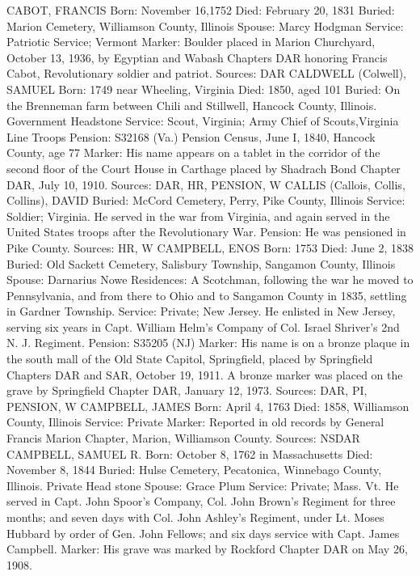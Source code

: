 CABOT, FRANCIS 
Born: November 16,1752 
Died: February 20, 1831 
Buried: Marion Cemetery, Williamson County, Illinois 
Spouse: Marcy Hodgman 
Service: Patriotic Service; Vermont 
Marker: Boulder placed in Marion Churchyard, October 13, 1936, by Egyptian and Wabash Chapters DAR honoring Francis Cabot, Revolutionary soldier and patriot. 
Sources: DAR 
CALDWELL (Colwell), SAMUEL 
Born: 1749 near Wheeling, Virginia 
Died: 1850, aged 101 
Buried: On the Brenneman farm between Chili and Stillwell, Hancock County, Illinois. Government Headstone 
Service: Scout, Virginia; Army Chief of Scouts,Virginia Line Troops
Pension: S32168 (Va.) Pension Census, June I, 1840, Hancock County, age 77 
Marker: His name appears on a tablet in the corridor of the second floor of the Court House in Carthage placed by Shadrach Bond Chapter DAR, July 10, 1910. 
Sources: DAR, HR, PENSION, W 
CALLIS (Callois, Collis, Collins), DAVID 
Buried: McCord Cemetery, Perry, Pike County, Illinois 
Service: Soldier; Virginia. He served in the war from Virginia, and again served in the United States troops after the Revolutionary War. 
Pension: He was pensioned in Pike County. 
Sources: HR, W 
CAMPBELL, ENOS 
Born: 1753 
Died: June 2, 1838 
Buried: Old Sackett Cemetery, Salisbury Township, Sangamon County, Illinois 
Spouse: Darnarius Nowe 
Residences: A Scotchman, following the war he moved to Pennsylvania, and from there to Ohio and to Sangamon County in 1835, settling in Gardner Town­ship. 
Service: Private; New Jersey. He enlisted in New Jersey, serving six years in Capt. William Helm's Company of Col. Israel Shriver's 2nd N. J. Regiment. 
Pension: S35205 (NJ) 
Marker: His name is on a bronze plaque in the south mall of the Old State Capitol, Springfield, placed by Springfield Chapters DAR and SAR, October 19, 1911. A bronze marker was placed on the grave by Springfield Chapter DAR, January 12, 1973. 
Sources: DAR, PI, PENSION, W 
CAMPBELL, JAMES 
Born: April 4, 1763 
Died: 1858, Williamson County, Illinois 
Service: Private 
Marker: Reported in old records by General Francis Marion Chapter, Marion, Williamson County. 
Sources: NSDAR 
CAMPBELL, SAMUEL R. 
Born: October 8, 1762 in Massachusetts
Died: November 8, 1844 
Buried: Hulse Cemetery, Pecatonica, Winnebago County, Illinois. Private Head­ stone 
Spouse: Grace Plum 
Service: Private; Mass. Vt. He served in Capt. John Spoor's Company, Col. John Brown's Regiment for three months; and seven days with Col. John Ashley's Regiment, under Lt. Moses Hubbard by order of Gen. John Fellows; and six days service with Capt. James Campbell. 
Marker: His grave was marked by Rockford Chapter DAR on May 26, 1908. 

